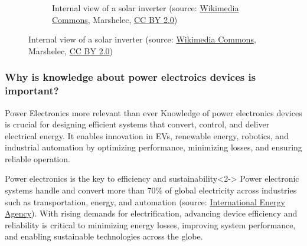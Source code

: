 \begin{frame}
\begin{figure}
\begin{subfigure}[t]{0.4\textwidth}
			\caption{Internal view of a solar inverter (source: \href{https://commons.wikimedia.org/wiki/File:Sunny_Boy_3000.jpg}{Wikimedia Commons}, Marshelec, \href{https://creativecommons.org/licenses/by/2.0/}{CC BY 2.0})}
		\end{subfigure}
	\end{figure}
\end{frame}

\begin{frame}
	\frametitle{Why is knowledge about power electroics devices is important?}
	\begin{varblock}{Power Electronics more relevant than ever}
		Knowledge of power electronics devices is crucial for designing efficient systems that convert, control, and deliver electrical energy. It enables innovation in EVs, renewable energy, robotics, and industrial automation by optimizing performance, minimizing losses, and ensuring reliable operation. 
	\end{varblock}
	\begin{varblock}{Power electronics is the key to efficiency and sustainability}<2->
		Power electronic systems handle and convert more than 70\% of global electricity across industries such as transportation, energy, and automation (source: \href{https://www.hitachienergy.com/news-and-events/perspectives/2021/08/power-electronics-revolutionizing-the-world-s-future-energy-systems}{International Energy Agency}). With rising demands for electrification, advancing device efficiency and reliability is critical to minimizing energy losses, improving system performance, and enabling sustainable technologies across the globe.
	\end{varblock}
\end{frame}

